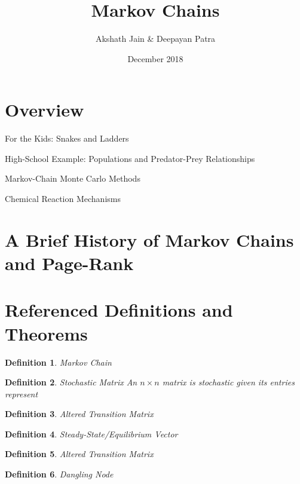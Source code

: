 \documentclass{article}
\title{Markov Chains}
\author{Akshath Jain \& Deepayan Patra}
\date{December 2018}
\newtheorem{definition}{Definition}
\begin{document}
\maketitle

\section{Overview}

For the Kids: Snakes and Ladders

High-School Example: Populations and Predator-Prey Relationships

Markov-Chain Monte Carlo Methods

Chemical Reaction Mechanisms

\section{A Brief History of Markov Chains and Page-Rank}

\section{Referenced Definitions and Theorems}
    \begin{definition}{Markov Chain}
    
    \end{definition}
    
    \begin{definition}{Stochastic Matrix}
    An $n \times n$ matrix is stochastic given its entries represent 
    \end{definition}
    
    \begin{definition}{Altered Transition Matrix}
    
    \end{definition}
    
    \begin{definition}{Steady-State/Equilibrium Vector}
    
    \end{definition}
    
    \begin{definition}{Altered Transition Matrix}

    \end{definition}
    
    \begin{definition}{Dangling Node}

    \end{definition}
    
\end{document}
